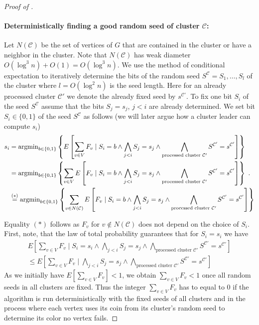 \begin{proof}[Proof of ]
\paragraph{Deterministically finding a good random seed of cluster $\mathcal{C}$:}Let $N(\mathcal{C})$ be the set of vertices of $G$ that are contained in the cluster or have a neighbor in the cluster. Note that $N(\mathcal{C})$ has weak diameter $O(\log^3 n)+O(1)=O(\log^3 n)$.  We use the method of conditional expectation to iteratively determine the bits of the random seed $S^{\mathcal{C}}=S_1,\ldots,S_{l}$ of the cluster where $l=O(\log^2 n)$ is the seed length. 
Here for an already processed cluster $\mathcal{C}'$ we denote the already fixed seed by $s^{\mathcal{C}'}$.
To fix one bit $S_i$ of the seed $S^{\mathcal{C}}$ assume that the bits $S_j=s_j$, $j<i$ are already determined. We set bit $S_i\in\{0,1\}$ of the seed $S^{\mathcal{C}}$ as follows (we will later argue how a cluster leader can compute $s_i$) 
\begin{align}
s_i & =\operatorname{argmin}_{b\in \{0,1\}} \left\{E\left[\sum_{v\in V} F_v \mid S_i=b \wedge  \bigwedge_{j<i} S_j=s_j \wedge \bigwedge_{\text{processed cluster }\mathcal{C}'}S^{\mathcal{C}'}=s^{\mathcal{C}'} \right]\right\} \label{eqn:argmin}\\
& =\operatorname{argmin}_{b\in \{0,1\}} \left\{\sum_{v\in V}E\left[F_v \mid S_i=b \wedge  \bigwedge_{j<i} S_j=s_j \wedge \bigwedge_{\text{processed cluster }\mathcal{C}'}S^{\mathcal{C}'}=s^{\mathcal{C}'}  \right]\right\}~. \\
& \stackrel{(*)}{=}\operatorname{argmin}_{b\in \{0,1\}} \left\{\sum_{v\in N(\mathcal{C})}E\left[F_v \mid S_i=b \wedge  \bigwedge_{j<i} S_j=s_j \wedge \bigwedge_{\text{processed cluster }\mathcal{C}'}S^{\mathcal{C}'}=s^{\mathcal{C}'}  \right]\right\}
\end{align}

Equality $(*)$ follows as $F_v$ for $v\notin N(\mathcal{C})$ does not depend on the choice of $S_i$. 
First, note, that the law of total probability guarantees that for $S_i=s_i$ we have 
\begin{align} 
E\left[\sum_{v\in V} F_v \mid S_i=s_i \wedge  \bigwedge_{j<i} S_j=s_j \wedge \bigwedge_{\text{processed cluster }\mathcal{C}'}S^{\mathcal{C}'}=s^{\mathcal{C}'}  \right] \\
\leq E\left[\sum_{v\in V} F_v \mid  \bigwedge_{j<i} S_j=s_j \wedge \bigwedge_{\text{processed cluster }\mathcal{C}'}S^{\mathcal{C}'}=s^{\mathcal{C}'}  \right]
\end{align}
As we initially have $E[\sum_{v\in V}F_v]<1$, we obtain $\sum_{v\in V}F_v<1$ once all random seeds in all clusters are fixed. Thus the integer $\sum_{v\in V}F_v$ has to equal to $0$ if the algorithm is run deterministically with the fixed seeds of all clusters and in the process where each vertex uses its coin from its cluster's random seed to determine its color no vertex fails.


\end{proof}
